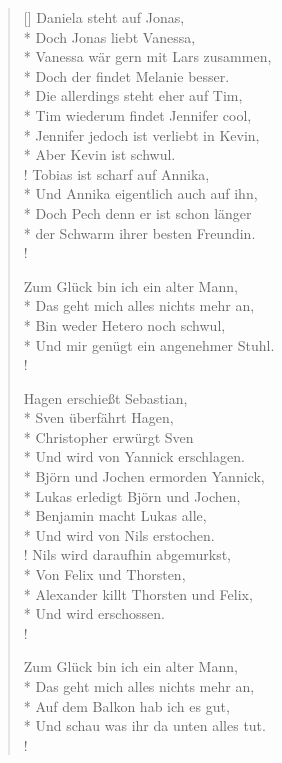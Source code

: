 \documentclass[a4paper,12pt,notitlepage]{article}
\begin{document}
  \begin{verse}[\versewidth]
	  Daniela steht auf Jonas, \\*
	  Doch Jonas liebt Vanessa, \\*
		Vanessa wär gern mit Lars zusammen, \\*
		Doch der findet Melanie besser. \\*
		Die allerdings steht eher auf Tim, \\*
		Tim wiederum findet Jennifer cool, \\*
		Jennifer jedoch ist verliebt in Kevin, \\*
		Aber Kevin ist schwul. \\!
		Tobias ist scharf auf Annika, \\*
		Und Annika eigentlich auch auf ihn, \\*
		Doch Pech denn er ist schon länger \\*
		der Schwarm ihrer besten Freundin. \\!

		Zum Glück bin ich ein alter Mann, \\*
		Das geht mich alles nichts mehr an, \\*
		Bin weder Hetero noch schwul, \\*
		Und mir genügt ein angenehmer Stuhl. \\!

		Hagen erschießt Sebastian, \\*
		Sven überfährt Hagen, \\*
		Christopher erwürgt Sven \\*
		Und wird von Yannick erschlagen. \\*
		Björn und Jochen ermorden Yannick, \\*
		Lukas erledigt Björn und Jochen, \\*
		Benjamin macht Lukas alle, \\*
		Und wird von Nils erstochen. \\!
		Nils wird daraufhin abgemurkst, \\*
		Von Felix und Thorsten, \\*
		Alexander killt Thorsten und Felix, \\*
		Und wird erschossen. \\!

		Zum Glück bin ich ein alter Mann, \\*
		Das geht mich alles nichts mehr an, \\*
		Auf dem Balkon hab ich es gut, \\*
		Und schau was ihr da unten alles tut. \\!


\end{verse}
\end{document}
